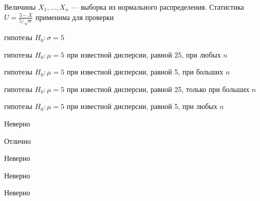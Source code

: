
\begin{question}
Величины \(X_1,\ldots,X_n\) --- выборка из нормального распределения.
Статистика \(U=\frac{5-\bar{X}}{5/\sqrt{n}}\) применима для проверки
\begin{answerlist}
  \item гипотезы \(H_0: \sigma = 5\)
  \item гипотезы \(H_0: \mu = 5\) при известной дисперсии, равной 25, при любых
\(n\)
  \item гипотезы \(H_0: \mu = 5\) при известной дисперсии, равной 5, при больших
\(n\)
  \item гипотезы \(H_0: \mu = 5\) при известной дисперсии, равной 25, только при
больших \(n\)
  \item гипотезы \(H_0: \mu = 5\) при известной дисперсии, равной 5, при любых
\(n\)
\end{answerlist}
\end{question}

\begin{solution}
\begin{answerlist}
  \item Неверно
  \item Отлично
  \item Неверно
  \item Неверно
  \item Неверно
\end{answerlist}
\end{solution}

